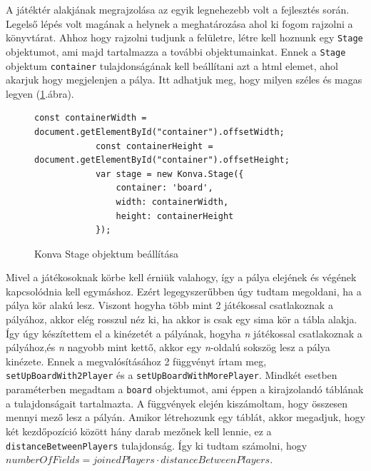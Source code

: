 \documentclass[a4paper,twoside]{article}
\begin{document}
A játéktér alakjának megrajzolása az egyik legnehezebb volt a fejlesztés során. Legelső lépés volt magának a helynek a meghatározása ahol ki fogom rajzolni a könyvtárat. Ahhoz hogy rajzolni tudjunk a felületre, létre kell hoznunk egy \verb|Stage| objektumot, ami majd tartalmazza a további objektumainkat. Ennek a \verb|Stage| objektum \verb|container| tulajdonságának kell beállítani azt a html elemet, ahol akarjuk hogy megjelenjen a pálya. Itt adhatjuk meg, hogy milyen széles és magas legyen (\ref{konvaStage}.ábra). 

\begin{figure}
	\caption{Konva Stage objektum beállítása}
	\begin{minipage}{\textwidth}
		\begin{lstlisting}[style=javascriptStyle]
			 const containerWidth = document.getElementById("container").offsetWidth;
			const containerHeight = document.getElementById("container").offsetHeight;
			var stage = new Konva.Stage({
				container: 'board',
				width: containerWidth,
				height: containerHeight
			});
		\end{lstlisting}
	\end{minipage}
	
	\label{konvaStage}
\end{figure}
\FloatBarrier

Mivel a játékosoknak körbe kell érniük valahogy, így a pálya elejének és végének kapcsolódnia kell egymáshoz. Ezért legegyszerűbben úgy tudtam megoldani, ha a pálya kör alakú lesz. Viszont hogyha több mint 2 játékossal csatlakoznak a pályához, akkor elég rosszul néz ki, ha akkor is csak egy sima kör a tábla alakja. Így úgy készítettem el a kinézetét a pályának, hogyha \textit{n} játékossal csatlakoznak a pályához,és \textit{n} nagyobb mint kettő, akkor egy \textit{n}-oldalú sokszög lesz a pálya kinézete. Ennek a megvalósításához 2 függvényt írtam meg, \verb|setUpBoardWith2Player| és a \verb|setUpBoardWithMorePlayer|. Mindkét esetben paraméterben megadtam a \verb|board| objektumot, ami éppen a kirajzolandó táblának a tulajdonságait tartalmazta. A függvények elején kiszámoltam, hogy összesen mennyi mező lesz a pályán. Amikor létrehozunk egy táblát, akkor megadjuk, hogy két kezdőpozíció között hány darab mezőnek kell lennie, ez a \verb|distanceBetweenPlayers| tulajdonság. Így ki tudtam számolni, hogy $numberOfFields = joinedPlayers \cdot distanceBetweenPlayers$.
\end{document}
